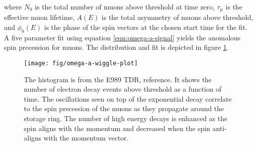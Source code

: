 where $N_0$ is the total number of muons above threshold at time zero, $\tau_\mu$ is the effective muon lifetime, $A(E)$ is the total asymmetry of muons above threshold, and $\phi_0(E)$ is the phase of the spin vectors at the chosen start time for the fit.  A five parameter fit using equation \ref{eqn:omega-a-signal} yields the anomalous spin precession for muons.  The distribution and fit is depicted in figure \ref{fig:omega-a-wiggle-plot}.

\begin{figure}
\centering
\texttt{[image: fig/omega-a-wiggle-plot]}
\caption{
    The histogram is from the E989 TDR, reference\cite{e989-tdr}.  It shows the number of electron decay events above threshold as a function of time.  The oscillations seen on top of the exponential decay correlate to the spin precession of the muons as they propagate around the storage ring.  The number of high energy decays is enhanced as the spin aligns with the momentum and decreased when the spin anti-aligns with the momentum vector. 
    \label{fig:omega-a-wiggle-plot}
}
\end{figure}
